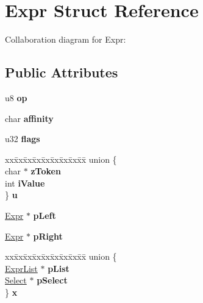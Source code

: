 \hypertarget{structExpr}{}\section{Expr Struct Reference}
\label{structExpr}


Collaboration diagram for Expr\+:
\subsection*{Public Attributes}
\begin{DoxyCompactItemize}
\item 
u8 {\bfseries op}\hypertarget{structExpr_a101c55ddb6c149d95f0327831eb78225}{}\label{structExpr_a101c55ddb6c149d95f0327831eb78225}

\item 
char {\bfseries affinity}\hypertarget{structExpr_aeb51b76e606d6fbae234e38473bf3dc9}{}\label{structExpr_aeb51b76e606d6fbae234e38473bf3dc9}

\item 
u32 {\bfseries flags}\hypertarget{structExpr_aebac9ee7e6aa7adca63969d3ba8d0ded}{}\label{structExpr_aebac9ee7e6aa7adca63969d3ba8d0ded}

\item 
\begin{tabbing}
xx\=xx\=xx\=xx\=xx\=xx\=xx\=xx\=xx\=\kill
union \{\\
\>char $\ast$ {\bfseries zToken}\\
\>int {\bfseries iValue}\\
\} {\bfseries u}\hypertarget{structExpr_a5a43a51aa0ee7afc9babcdc337dd77db}{}\label{structExpr_a5a43a51aa0ee7afc9babcdc337dd77db}
\\

\end{tabbing}\item 
\hyperlink{structExpr}{Expr} $\ast$ {\bfseries p\+Left}\hypertarget{structExpr_a0a78282ae0d696f4a25013a12e38b1ba}{}\label{structExpr_a0a78282ae0d696f4a25013a12e38b1ba}

\item 
\hyperlink{structExpr}{Expr} $\ast$ {\bfseries p\+Right}\hypertarget{structExpr_aa08c218d5b0b6f8882e8bf9ec8822a08}{}\label{structExpr_aa08c218d5b0b6f8882e8bf9ec8822a08}

\item 
\begin{tabbing}
xx\=xx\=xx\=xx\=xx\=xx\=xx\=xx\=xx\=\kill
union \{\\
\>\hyperlink{structExprList}{ExprList} $\ast$ {\bfseries pList}\\
\>\hyperlink{structSelect}{Select} $\ast$ {\bfseries pSelect}\\
\} {\bfseries x}\hypertarget{structExpr_a9ff6313055718299e20a19e551dcbf0a}{}\label{structExpr_a9ff6313055718299e20a19e551dcbf0a}
\\


\end{tabbing}
\end{DoxyCompactItemize}
